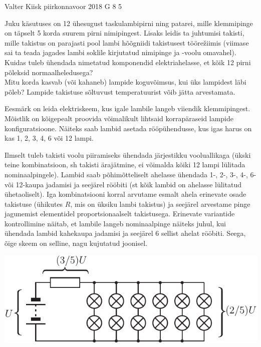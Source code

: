 {Valter Kiisk} %
{piirkonnavoor} %
{2018} %
{G 8} %
{5} %
{
\ifStatement
Juku käsutuses on 12 ühesugust taskulambipirni ning patarei, mille klemmipinge on täpselt 5 korda suurem pirni nimipingest. Lisaks leidis ta juhtumisi takisti, mille takistus on parajasti pool lambi hõõgniidi takistusest töörežiimis (viimase sai ta teada jagades lambi soklile kirjutatud nimipinge ja -voolu omavahel).\\
\osa Kuidas tuleb ühendada nimetatud komponendid elektriahelasse, et kõik 12 pirni põleksid normaalheledusega?\\
\osa Mitu korda kasvab (või kahaneb) lampide koguvõimsus, kui üks lampidest läbi põleb? Lampide takistuse sõltuvust temperatuurist võib jätta arvestamata.
\fi


\ifHint
Eesmärk on leida elektriskeem, kus igale lambile langeb viiendik klemmipingest. Mõistlik on kõigepealt proovida võimalikult lihtsaid korrapäraseid lampide konfiguratsioone. Näiteks saab lambid asetada rööpühendusse, kus igas harus on kas 1, 2, 3, 4, 6 või 12 lampi.
\fi


\ifSolution
\osa Ilmselt tuleb takisti voolu piiramiseks ühendada järjestikku vooluallikaga (ükski teine kombinatsioon, sh takisti ärajätmine, ei võimalda kõiki 12 lampi lülitada nominaalpingele). Lambid saab põhimõtteliselt ahelasse ühendada 1-, 2-, 3-, 4-, 6- või 12-kaupa jadamisi ja seejärel rööbiti (st kõik lambid on ahelasse lülitatud ühetaoliselt). Iga kombinatsiooni korral arvutame esmalt ahela erinevate osade takistuse (ühikutes $R$, mis on üksiku lambi takistus) ja seejärel arvestame pinge jagunemist elementidel proportsionaalselt takistusega. Erinevate variantide kontrollimine näitab, et lambile langeb nominaalpinge näiteks juhul, kui ühendada lambid kahekaupa jadamisi ja seejärel 6 sellist ahelat rööbiti. Seega, õige skeem on selline, nagu kujutatud joonisel.

\begin{center}
\includegraphics{2018-v2g-08-lambid-joonis.pdf}
\end{center}

}
